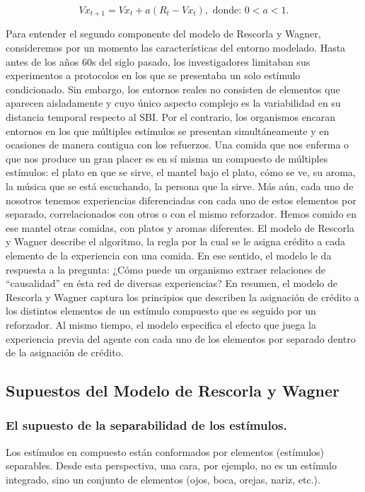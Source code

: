 \documentclass[
  letterpaper,
]{book}
\begin{document}
\[
Vx_{t+1}= Vx_t + a (R_t - Vx_t), \text{  donde:  } 0<a<1.   
\]

Para entender el segundo componente del modelo de Rescorla y Wagner,
consideremos por un momento las características del entorno modelado.
Hasta antes de los años 60s del siglo pasado, los investigadores
limitaban sus experimentos a protocolos en los que se presentaba un solo
estímulo condicionado. Sin embargo, los entornos reales no consisten de
elementos que aparecen aisladamente y cuyo único aspecto complejo es la
variabilidad en su distancia temporal respecto al SBI. Por el contrario,
los organismos encaran entornos en los que múltiples estímulos se
presentan simultáneamente y en ocasiones de manera contigua con los
refuerzos. Una comida que nos enferma o que nos produce un gran placer
es en sí misma un compuesto de múltiples estímulos: el plato en que se
sirve, el mantel bajo el plato, cómo se ve, su aroma, la música que se
está escuchando, la persona que la sirve. Más aún, cada uno de nosotros
tenemos experiencias diferenciadas con cada uno de estos elementos por
separado, correlacionados con otros o con el mismo reforzador. Hemos
comido en ese mantel otras comidas, con platos y aromas diferentes. El
modelo de Rescorla y Wagner describe el algoritmo, la regla por la cual
se le asigna crédito a cada elemento de la experiencia con una comida.
En ese sentido, el modelo le da respuesta a la pregunta: ¿Cómo puede un
organismo extraer relaciones de ``causalidad'' en ésta red de diversas
experiencias? En resumen, el modelo de Rescorla y Wagner captura los
principios que describen la asignación de crédito a los distintos
elementos de un estímulo compuesto que es seguido por un reforzador. Al
mismo tiempo, el modelo especifica el efecto que juega la experiencia
previa del agente con cada uno de los elementos por separado dentro de
la asignación de crédito.

\subsection{Supuestos del Modelo de Rescorla y
Wagner}\label{supuestos-del-modelo-de-rescorla-y-wagner}

\subsubsection{El supuesto de la separabilidad de los
estímulos.}\label{el-supuesto-de-la-separabilidad-de-los-estuxedmulos.}

Los estímulos en compuesto están conformados por elementos (estímulos)
separables. Desde esta perspectiva, una cara, por ejemplo, no es un
estímulo integrado, sino un conjunto de elementos (ojos, boca, orejas,
nariz, etc.).
\end{document}
